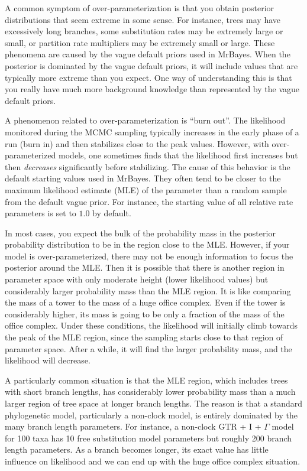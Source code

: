 \documentclass[12pt]{book}
\begin{document}
A common symptom of over-parameterization is that you obtain posterior distributions that seem
extreme in some sense. For instance, trees may have excessively long branches, some substitution
rates may be extremely large or small, or partition rate multipliers may be extremely small or large.
These phenomena are caused by the vague default priors used in MrBayes. When the posterior is
dominated by the vague default priors, it will include values that are typically more extreme than you
expect. One way of understanding this is that you really have much more background knowledge
than represented by the vague default priors.

A phenomenon related to over-parameterization is ``burn out''. The likelihood
monitored during the MCMC sampling typically increases in the early phase of a run (burn in) and
then stabilizes close to the peak values. However, with over-parameterized models, one sometimes
finds that the likelihood first increases but then \emph{decreases} significantly before stabilizing.
The cause of this behavior is the default starting values used in MrBayes. They often tend to be closer
to the maximum likelihood estimate (MLE) of the parameter than a random sample from the
default vague prior. For instance, the starting value of all relative rate parameters is set to $1.0$
by default.

In most cases, you expect the bulk of the probability mass in the posterior probability
distribution to be in the region close to the MLE. However, if your model is over-parameterized, there
may not be enough information to focus the posterior around the MLE. Then it is possible that there
is another region in parameter space with only moderate height (lower likelihood values) but
considerably larger probability mass than the MLE region. It is like comparing the mass of a tower
to the mass of a huge office complex. Even if the tower is considerably higher, its mass is going to
be only a fraction of the mass of the office complex. Under these conditions, the likelihood will initially
climb towards the peak of the MLE region, since the sampling starts close to that region of parameter
space. After a while, it will find the larger probability mass, and the likelihood will decrease.

A particularly common situation is that the MLE region, which includes trees with short branch lengths, has
considerably lower probability mass than a much larger region of tree space at longer branch lengths. The
reason is that a standard phylogenetic model, particularly a non-clock model, is entirely dominated by the
many branch length parameters. For instance, a non-clock GTR + I + $\Gamma$ model for 100 taxa has
10 free substitution model parameters but roughly 200 branch length parameters. As a branch becomes
longer, its exact value has little influence on likelihood and we can end up with the huge office complex
situation.
\end{document}

